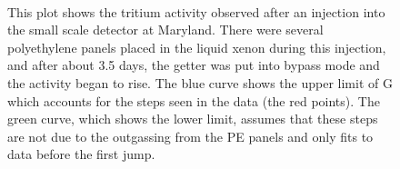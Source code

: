 \begin{figure}[h!]
\centering
{}\\
\caption{This plot shows the tritium activity observed after an injection into the small scale detector at Maryland. There were several polyethylene panels placed in the liquid xenon during this injection, and after about 3.5 days, the getter was put into bypass mode and the activity began to rise. The blue curve shows the upper limit of G which accounts for the steps seen in the data (the red points). The green curve, which shows the lower limit, assumes that these steps are not due to the outgassing from the PE panels and only fits to data before the first jump.}
\label{fig:StepsFit}
\end{figure}

